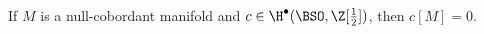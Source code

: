 \begin{proposition}\label{prop:pontryagin-}
	If $M$ is a null-cobordant manifold and $c\in \H^\bullet(\BSO, \Z[\frac12])$, then $c[M]=0$.
\end{proposition}

%
%

